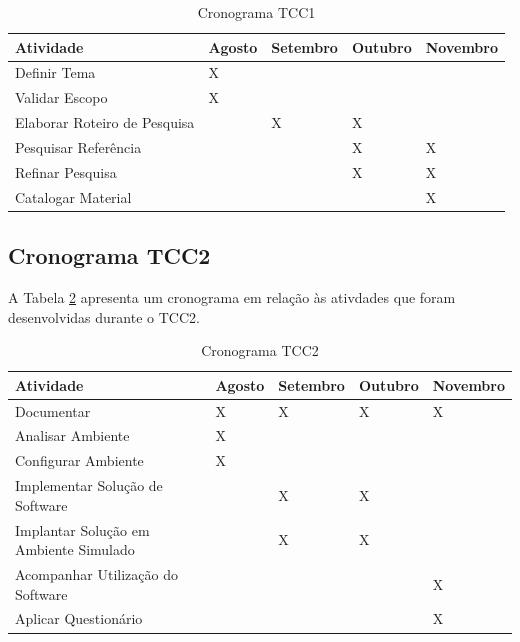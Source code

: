 \begin{table}[h!]
\centering
\caption{Cronograma TCC1}
\label{cronograma_tcc1}
\begin{tabular}{lllll}
\textbf{Atividade}           & \textbf{Agosto} & \textbf{Setembro} & \textbf{Outubro} & \textbf{Novembro} \\ \hline
Definir Tema                 & X               &                   &                  &                   \\ \hline
Validar Escopo               & X               &                   &                  &                   \\ \hline
Elaborar Roteiro de Pesquisa &                 & X                 & X                &                   \\ \hline
Pesquisar Referência         &                 &                   & X                & X                 \\ \hline
Refinar Pesquisa             &                 &                   & X                & X                 \\ \hline
Catalogar Material           &                 &                   &                  & X                 \\ \hline
\end{tabular}
\end{table}

\subsection{Cronograma TCC2}
A Tabela \ref{cronograma_tcc2} apresenta um cronograma em relação às ativdades que foram desenvolvidas durante o TCC2.
\begin{table}[h!]
\centering
\caption{Cronograma TCC2}
\label{cronograma_tcc2}
\begin{tabular}{lllll}
\textbf{Atividade}                     & \textbf{Agosto} & \textbf{Setembro} & \textbf{Outubro} & \textbf{Novembro} \\ \hline
Documentar                             & X              & X              & X             & X              \\ \hline
Analisar Ambiente                      & X              &                &               &                \\ \hline
Configurar Ambiente                    & X              &                &               &                \\ \hline
Implementar Solução de Software        &                & X              & X             &                \\ \hline
Implantar Solução em Ambiente Simulado &                & X              & X             &                \\ \hline
Acompanhar Utilização do Software      &                &                &               & X              \\ \hline
Aplicar Questionário                   &                &                &               & X              \\ \hline
\end{tabular}
\end{table}

